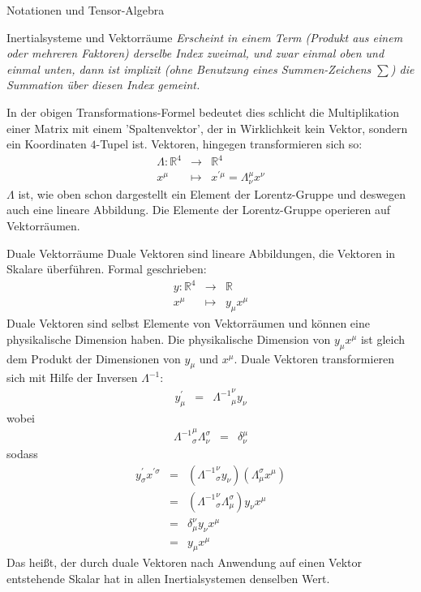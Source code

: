 \begin{chapter}{\titlestr}
\begin{section}{Notationen und Tensor-Algebra}
\begin{subsection}{Inertialsysteme und Vektorräume}
\textit{Erscheint in einem Term (Produkt aus einem oder mehreren Faktoren) derselbe Index zweimal, und zwar einmal oben und einmal unten,
dann ist implizit (ohne Benutzung eines Summen-Zeichens $\sum$) die Summation über diesen Index gemeint.
}

In der obigen Transformations-Formel bedeutet dies schlicht die Multiplikation einer Matrix mit einem 'Spaltenvektor', der in Wirklichkeit kein Vektor, sondern ein Koordinaten $4$-Tupel ist. Vektoren, hingegen transformieren sich so:
\begin{eqnarray*}
\Lambda: \mathbb{R}^4 &\rightarrow& \mathbb{R}^4\\
x^\mu &\mapsto& x^{\prime\mu}=\Lambda^\mu_\nu x^\nu
\end{eqnarray*}
$\Lambda$ ist, wie oben schon dargestellt ein Element der Lorentz-Gruppe und deswegen auch eine lineare Abbildung. Die Elemente der Lorentz-Gruppe operieren auf Vektorräumen.
\end{subsection}

\begin{subsection}{Duale Vektorräume}
Duale Vektoren sind lineare Abbildungen, die Vektoren in Skalare überführen.
Formal geschrieben:
\begin{eqnarray*}
y: \mathbb{R}^4 &\rightarrow& \mathbb{R}\\
x^\mu &\mapsto& y_\mu x^\mu
\end{eqnarray*}
Duale Vektoren sind selbst Elemente von Vektorräumen und können eine physikalische Dimension haben. Die physikalische Dimension
von $y_\mu x^\mu$ ist gleich dem Produkt der Dimensionen von $y_\mu$ und $x^\mu$. Duale Vektoren transformieren sich mit Hilfe der Inversen $\Lambda^{-1}$:
\begin{eqnarray*}
y^\prime_\mu &=& {\Lambda^{-1}}_\mu^\nu y_\nu
\end{eqnarray*}
wobei
\begin{eqnarray*}
{\Lambda^{-1}}^\mu_\sigma \Lambda^\sigma_\nu &=& \delta^\mu_\nu
\end{eqnarray*}
sodass
\begin{eqnarray*}
y^\prime_\sigma x^{\prime\sigma} &=& \left({\Lambda^{-1}}_\sigma^\nu y_\nu\right)
\left(\Lambda^\sigma_\mu x^\mu\right)\\
&=& \left({\Lambda^{-1}}_\sigma^\nu \Lambda^\sigma_\mu\right)y_\nu x^\mu\\
&=& \delta^\nu_\mu y_\nu x^\mu\\
&=& y_\mu x^\mu
\end{eqnarray*}
Das heißt, der durch duale Vektoren nach Anwendung auf einen Vektor entstehende Skalar hat in allen Inertialsystemen denselben Wert.
\end{subsection}


\end{section}
\end{chapter}
